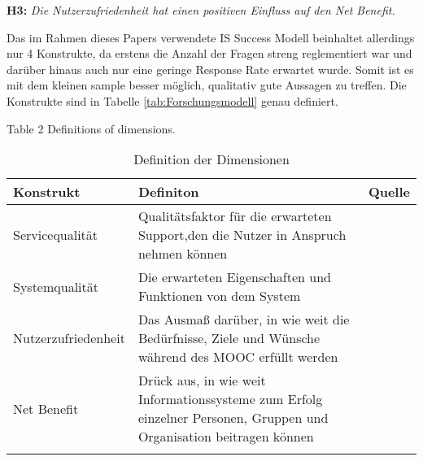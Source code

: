 \textbf{H3:} \textit{Die Nutzerzufriedenheit hat einen positiven Einfluss auf den Net Benefit.} 

Das im Rahmen dieses Papers verwendete IS Success Modell beinhaltet allerdings nur 4 Konstrukte, da erstens die Anzahl der Fragen streng reglementiert war und darüber hinaus auch nur eine geringe Response Rate erwartet wurde. Somit ist es mit dem kleinen sample besser möglich, qualitativ gute Aussagen zu treffen. Die Konstrukte sind in Tabelle \ref{tab:Forschungsmodell} genau definiert.


Table 2
Definitions of dimensions.

\begin{table}[ht] 
\footnotesize
\caption{Definition der Dimensionen}
\label{tab:Dimensionen} 
\begin{tabular}{@{}lp{9cm}l@{}} \toprule

\textbf{Konstrukt} & \textbf{Definiton} & \textbf{Quelle} \\ \midrule



Servicequalität & Qualitätsfaktor für die erwarteten Support,den die Nutzer in Anspruch nehmen können & \parbox[t]{4cm}{\cite{petter2008measuring}}\\ 
Systemqualität & Die erwarteten Eigenschaften und Funktionen von dem System & \parbox[t]{4cm}{\cite{petter2008measuring}}\\ Nutzerzufriedenheit & Das Ausmaß darüber, in wie weit die Bedürfnisse, Ziele und Wünsche während des MOOC erfüllt werden & \parbox[t]{4cm}{\cite{sanchez2009moderating}}\\ 
Net Benefit & \parbox[t]{9cm}{Drück aus, in wie weit Informationssysteme zum Erfolg einzelner Personen, Gruppen und Organisation beitragen können}  & \parbox[t]{4cm}{\cite{conf/gi/GemlikNSB10} \cite{Petter:0aa} }\\ \addlinespace 
  \bottomrule

\end{tabular}	
\end{table}


